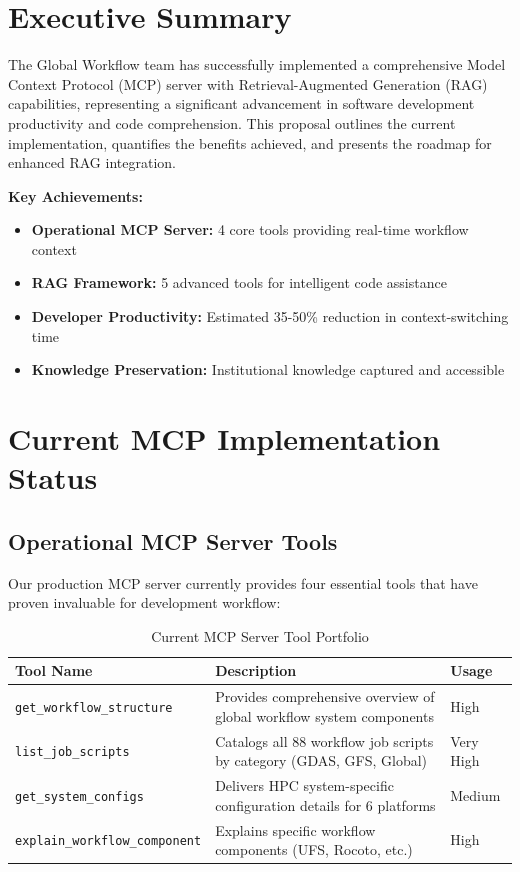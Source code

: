 \documentclass[11pt,letterpaper]{article}
\begin{document}
\section*{Executive Summary}
\begin{executivebox}
The Global Workflow team has successfully implemented a comprehensive Model Context Protocol (MCP) server with Retrieval-Augmented Generation (RAG) capabilities, representing a significant advancement in software development productivity and code comprehension. This proposal outlines the current implementation, quantifies the benefits achieved, and presents the roadmap for enhanced RAG integration.

\textbf{Key Achievements:}
\begin{itemize}[leftmargin=20pt]
    \item \textbf{Operational MCP Server:} 4 core tools providing real-time workflow context
    \item \textbf{RAG Framework:} 5 advanced tools for intelligent code assistance
    \item \textbf{Developer Productivity:} Estimated 35-50\% reduction in context-switching time
    \item \textbf{Knowledge Preservation:} Institutional knowledge captured and accessible
\end{itemize}
\end{executivebox}

\section{Current MCP Implementation Status}

\subsection{Operational MCP Server Tools}
Our production MCP server currently provides four essential tools that have proven invaluable for development workflow:

\begin{table}[h!]
\centering
\begin{tabularx}{\textwidth}{|l|X|l|}
\hline
\textbf{Tool Name} & \textbf{Description} & \textbf{Usage} \\
\hline
\texttt{get\_workflow\_structure} & Provides comprehensive overview of global workflow system components & High \\
\hline
\texttt{list\_job\_scripts} & Catalogs all 88 workflow job scripts by category (GDAS, GFS, Global) & Very High \\
\hline
\texttt{get\_system\_configs} & Delivers HPC system-specific configuration details for 6 platforms & Medium \\
\hline
\texttt{explain\_workflow\_component} & Explains specific workflow components (UFS, Rocoto, etc.) & High \\
\hline
\end{tabularx}
\caption{Current MCP Server Tool Portfolio}
\end{table}
\end{document}
